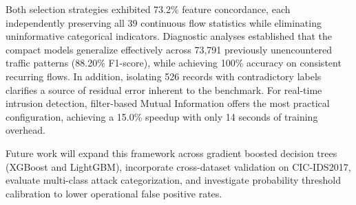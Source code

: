 \documentclass[conference]{IEEEtran}
\begin{document}
Both selection strategies exhibited 73.2\% feature concordance, each independently preserving all 39 continuous flow statistics while eliminating uninformative categorical indicators. Diagnostic analyses established that the compact models generalize effectively across 73,791 previously unencountered traffic patterns (88.20\% F1-score), while achieving 100\% accuracy on consistent recurring flows. In addition, isolating 526 records with contradictory labels clarifies a source of residual error inherent to the benchmark. For real-time intrusion detection, filter-based Mutual Information offers the most practical configuration, achieving a 15.0\% speedup with only 14 seconds of training overhead.

Future work will expand this framework across gradient boosted decision trees (XGBoost and LightGBM), incorporate cross-dataset validation on CIC-IDS2017, evaluate multi-class attack categorization, and investigate probability threshold calibration to lower operational false positive rates.



\end{document}
